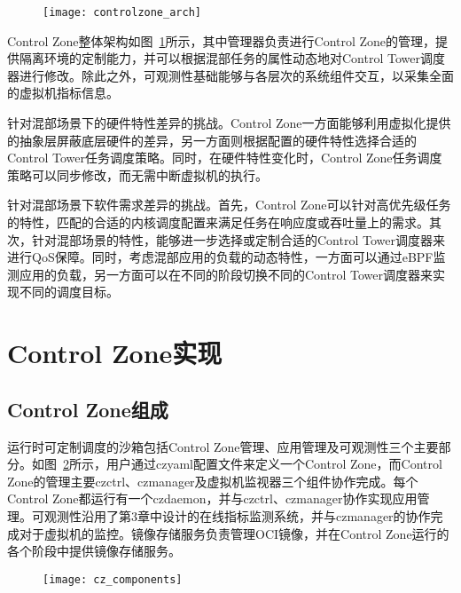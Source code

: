 \begin{figure}[!htbp]
    \centering
    \texttt{[image: controlzone\_arch]}
    \label{fig:controlzone_arch}
\end{figure}
 
Control Zone整体架构如图~\ref{fig:controlzone_arch}所示，其中管理器负责进行Control Zone的管理，提供隔离环境的定制能力，并可以根据混部任务的属性动态地对Control Tower调度器进行修改。除此之外，可观测性基础能够与各层次的系统组件交互，以采集全面的虚拟机指标信息。

针对混部场景下的硬件特性差异的挑战。Control Zone一方面能够利用虚拟化提供的抽象层屏蔽底层硬件的差异，另一方面则根据配置的硬件特性选择合适的Control Tower任务调度策略。同时，在硬件特性变化时，Control Zone任务调度策略可以同步修改，而无需中断虚拟机的执行。

针对混部场景下软件需求差异的挑战。首先，Control Zone可以针对高优先级任务的特性，匹配的合适的内核调度配置来满足任务在响应度或吞吐量上的需求。其次，针对混部场景的特性，能够进一步选择或定制合适的Control Tower调度器来进行QoS保障。同时，考虑混部应用的负载的动态特性，一方面可以通过eBPF监测应用的负载，另一方面可以在不同的阶段切换不同的Control Tower调度器来实现不同的调度目标。

\section{Control Zone实现}

\subsection{Control Zone组成}


运行时可定制调度的沙箱包括Control Zone管理、应用管理及可观测性三个主要部分。如图~\ref{fig:cz_components}所示，用户通过czyaml配置文件来定义一个Control Zone，而Control Zone的管理主要czctrl、czmanager及虚拟机监视器三个组件协作完成。每个Control Zone都运行有一个czdaemon，并与czctrl、czmanager协作实现应用管理。可观测性沿用了第3章中设计的在线指标监测系统，并与czmanager的协作完成对于虚拟机的监控。镜像存储服务负责管理OCI镜像，并在Control Zone运行的各个阶段中提供镜像存储服务。

\begin{figure}[!htbp]
    \centering
    \texttt{[image: cz\_components]}
    \label{fig:cz_components}
\end{figure}

